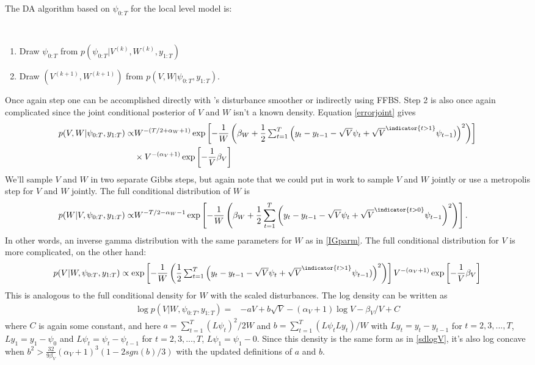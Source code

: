 The DA algorithm based on $\psi_{0:T}$ for the local level model is:
\begin{alg}\mbox{}\\[-\baselineskip]
\begin{enumerate}\label{erroralg}
  \item Draw $\psi_{0:T}$ from $p(\psi_{0:T}|V^{(k)},W^{(k)},y_{1:T})$
  \item Draw $(V^{(k+1)},W^{(k+1)})$ from $p(V,W|\psi_{0:T},y_{1:T})$.
\end{enumerate}
\end{alg}
Once again step one can be accomplished directly with \citeauthor{koopman1993disturbance}'s disturbance smoother or indirectly using FFBS. Step 2 is also once again complicated since the joint conditional posterior of $V$ and $W$ isn't a known density. Equation \eqref{errorjoint} gives
\begin{align*}
p(V,W|\psi_{0:T},y_{1:T})\propto &W^{-\left(T/2 + \alpha_W + 1\right)} \exp\left[-\frac{1}{W}\left(\beta_W + \frac{1}{2}\textstyle\sum_{t=1}^T\left( y_t - y_{t-1} - \sqrt{V}\psi_t + \sqrt{V}^{\indicator{t>1}}\psi_{t-1})\right)^2 \right) \right] \\
&\times V^{-\left(\alpha_V + 1\right)} \exp\left[-\frac{1}{V}\beta_V\right]
\end{align*}
We'll sample $V$ and $W$ in two separate Gibbs steps, but again note that we could put in work to sample $V$ and $W$ jointly or use a metropolis step for $V$ and $W$ jointly. The full conditional distribution of $W$ is
\begin{align*}
  p(W|V,\psi_{0:T},y_{1:T}) \propto & W^{-T/2 - \alpha_W - 1}\exp\left[-\frac{1}{W}\left(\beta_W + \frac{1}{2}\sum_{t=1}^T\left(y_t - y_{t-1} - \sqrt{V}\psi_t + \sqrt{V}^{\indicator{t>0}}\psi_{t-1}\right)^2\right)\right].
\end{align*}
In other words, an inverse gamma distribution with the same parameters for $W$ as in \eqref{IGparm}. The full conditional distribution for $V$ is more complicated, on the other hand:
\[
p(V|W,\psi_{0:T},y_{1:T})\propto \exp\left[-\frac{1}{W}\left(\frac{1}{2}\textstyle\sum_{t=1}^T\left( y_t - y_{t-1} - \sqrt{V}\psi_t + \sqrt{V}^{\indicator{t>1}}\psi_{t-1})\right)^2 \right) \right] V^{-\left(\alpha_V + 1\right)} \exp\left[-\frac{1}{V}\beta_V\right]
\]
This is analogous to the full conditional density for $W$ with the scaled disturbances. The log density can be written as
\begin{align*}
\log p(V|W,\psi_{0:T},y_{1:T}) =& -aV + b\sqrt{V} - (\alpha_V + 1)\log V -\beta_V/V + C
\end{align*}
where $C$ is again some constant, and here $a=\sum_{t=1}^T(L\psi_t)^2/2W$ and $b=\sum_{t=1}^T(L\psi_tLy_t)/W$ with $Ly_t=y_t-y_{t-1}$ for $t=2,3,...,T$, $Ly_1= y_1 - \psi_0$ and $L\psi_t = \psi_t - \psi_{t-1}$ for $t=2,3,...,T$, $L\psi_1=\psi_1-0$. Since this density is the same form as in \eqref{sdlogV}, it's also log concave when $b^2 > \frac{32}{9\beta_V}(\alpha_V+1)^3(1 - 2sgn(b)/3)$ with the updated definitions of $a$ and $b$.


